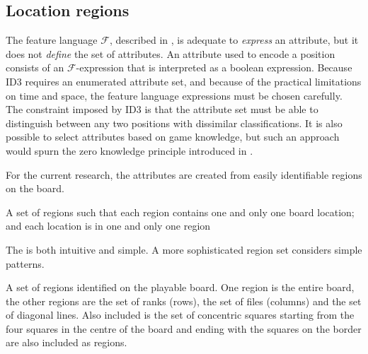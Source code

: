 \subsection{Location regions}
The feature language $\mathcal F$, described in , is adequate to {\sl express} an attribute, but it does not {\sl define} the set of attributes. An attribute used to encode a position consists of an  $\mathcal F$-expression that is interpreted as a boolean expression. 
Because ID3 requires an enumerated attribute set, and because of the practical limitations on time and space, the feature language expressions must be chosen carefully.  The constraint imposed by ID3 is that the attribute set must be able to distinguish between any two positions with dissimilar classifications.   
It is also possible to select attributes based on game knowledge, but such an approach would spurn the zero knowledge principle introduced in .  

For the current research, the attributes are created from easily identifiable regions on the board. 

 {A set of regions such that each region contains one and only one board location; and each location is in one and only one region}

The  is both intuitive and simple.  A more sophisticated region set considers simple patterns.

 {A set of regions identified on the playable board. One region is the entire board, the other regions are the set of ranks (rows), the set of files (columns) and the set of diagonal lines. Also included is the set of concentric squares starting from the four squares in the centre of the board and ending with the squares on the border are also included as regions.}  


